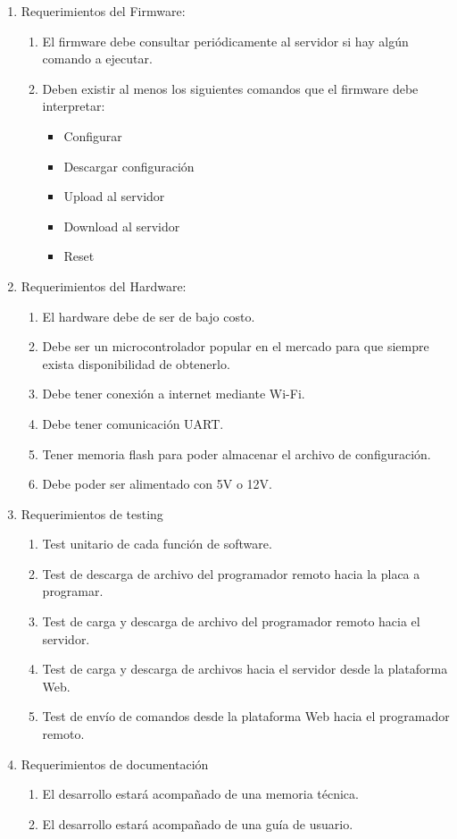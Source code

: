\documentclass[
11pt, %
]{charter}
\begin{document}
\begin{enumerate}
		
	\item Requerimientos del Firmware:
		\begin{enumerate}
			\item El firmware debe consultar periódicamente al servidor si hay algún comando a ejecutar.
			\item Deben existir al menos los siguientes comandos que el firmware debe interpretar:
			\begin{itemize}
				\item Configurar
				\item Descargar configuración
				\item Upload al servidor
				\item Download al servidor
				\item Reset
			\end{itemize}
		\end{enumerate}
	\item Requerimientos del Hardware:
		\begin{enumerate}
			\item El hardware debe de ser de bajo costo.
			\item Debe ser un microcontrolador popular en el mercado para que siempre exista disponibilidad de obtenerlo.
			\item Debe tener conexión a internet mediante Wi-Fi.
			\item Debe tener comunicación UART.
			\item Tener memoria flash para poder almacenar el archivo de configuración.
			\item Debe poder ser alimentado con 5V o 12V.
		\end{enumerate}
	\item Requerimientos de testing
		\begin{enumerate}
			\item Test unitario de cada función de software.
			\item Test de descarga de archivo del programador remoto hacia la placa a programar.
			\item Test de carga y descarga de archivo del programador remoto hacia el servidor.
			\item Test de carga y descarga de archivos hacia el servidor desde la plataforma Web.
			\item Test de envío de comandos desde la plataforma Web hacia el programador remoto.
		\end{enumerate}
	\item Requerimientos de documentación
		\begin{enumerate}
			\item El desarrollo estará acompañado de una memoria técnica.
			\item El desarrollo estará acompañado de una guía de usuario.
		\end{enumerate}
\end{enumerate}
\end{document}
